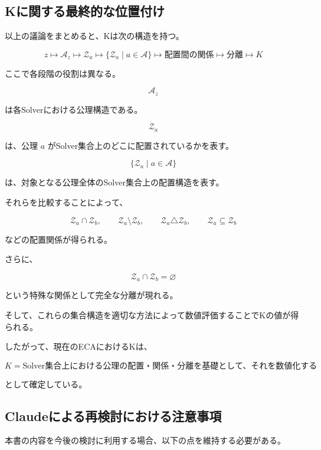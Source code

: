 \subsection{Kに関する最終的な位置付け}

以上の議論をまとめると、Kは次の構造を持つ。

\[
\boxed{
z
\longmapsto
\mathcal{A}_z
\longmapsto
\mathcal{Z}_a
\longmapsto
\{\mathcal{Z}_a\mid a\in\mathcal{A}\}
\longmapsto
\text{配置間の関係}
\longmapsto
\text{分離}
\longmapsto
K
}
\]

ここで各段階の役割は異なる。

\[
\mathcal{A}_z
\]

は各Solverにおける公理構造である。

\[
\mathcal{Z}_a
\]

は、公理 $a$ がSolver集合上のどこに配置されているかを表す。

\[
\{\mathcal{Z}_a\mid a\in\mathcal{A}\}
\]

は、対象となる公理全体のSolver集合上の配置構造を表す。

それらを比較することによって、

\[
\mathcal{Z}_a\cap\mathcal{Z}_b,
\qquad
\mathcal{Z}_a\setminus\mathcal{Z}_b,
\qquad
\mathcal{Z}_a\triangle\mathcal{Z}_b,
\qquad
\mathcal{Z}_a\subseteq\mathcal{Z}_b
\]

などの配置関係が得られる。

さらに、

\[
\mathcal{Z}_a\cap\mathcal{Z}_b=\varnothing
\]

という特殊な関係として完全な分離が現れる。

そして、これらの集合構造を適切な方法によって数値評価することでKの値が得られる。

したがって、現在のECAにおけるKは、

\[
\boxed{
K=
\text{Solver集合上における公理の配置・関係・分離を基礎として、それを数値化する量}
}
\]

として確定している。

\subsection{Claudeによる再検討における注意事項}

本書の内容を今後の検討に利用する場合、以下の点を維持する必要がある。

